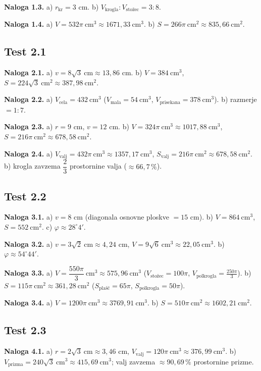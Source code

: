 \documentclass[a4paper,12pt]{article}
\theoremstyle{naloga}
\begin{document}
\textbf{Naloga 1.3.} a) $r_{\text{kr}}=3$ cm.\quad
b) $V_{\text{krogla}}:V_{\text{stožec}}=3:8$.

\textbf{Naloga 1.4.} a) $V=532\pi\ \text{cm}^3\approx1671{,}33\ \text{cm}^3$.\quad
b) $S=266\pi\ \text{cm}^2\approx835{,}66\ \text{cm}^2$.

\subsection*{Test 2.1}
\textbf{Naloga 2.1.} a) $v=8\sqrt3\ \text{cm}\approx13{,}86$ cm.\quad
b) $V=384\ \text{cm}^3$, $S=224\sqrt3\ \text{cm}^2\approx387{,}98\ \text{cm}^2$.

\textbf{Naloga 2.2.} a) $V_{\text{cela}}=432\ \text{cm}^3$ ($V_{\text{mala}}=54\ \text{cm}^3$, $V_{\text{prisekana}}=378\ \text{cm}^3$).\quad
b) razmerje $=1:7$.

\textbf{Naloga 2.3.} a) $r=9$ cm, $v=12$ cm.\quad
b) $V=324\pi\ \text{cm}^3\approx1017{,}88\ \text{cm}^3$, $S=216\pi\ \text{cm}^2\approx678{,}58\ \text{cm}^2$.

\textbf{Naloga 2.4.} a) $V_{\text{valj}}=432\pi\ \text{cm}^3\approx1357{,}17\ \text{cm}^3$, $S_{\text{valj}}=216\pi\ \text{cm}^2\approx678{,}58\ \text{cm}^2$.\quad
b) krogla zavzema $\dfrac{2}{3}$ prostornine valja ($\approx66{,}7\,\%$).

\subsection*{Test 2.2}
\textbf{Naloga 3.1.} a) $v=8$ cm (diagonala osnovne ploskve $=15$ cm).\quad
b) $V=864\ \text{cm}^3$, $S=552\ \text{cm}^2$.\quad
c) $\varphi\approx28^{\circ}4'$.

\textbf{Naloga 3.2.} a) $v=3\sqrt2\ \text{cm}\approx4{,}24$ cm, $V=9\sqrt6\ \text{cm}^3\approx22{,}05\ \text{cm}^3$.\quad
b) $\varphi\approx54^{\circ}44'$.

\textbf{Naloga 3.3.} a) $V=\dfrac{550\pi}{3}\ \text{cm}^3\approx575{,}96\ \text{cm}^3$ ($V_{\text{stožec}}=100\pi$, $V_{\text{polkrogla}}=\tfrac{250\pi}{3}$).\quad
b) $S=115\pi\ \text{cm}^2\approx361{,}28\ \text{cm}^2$ ($S_{\text{plašč}}=65\pi$, $S_{\text{polkrogla}}=50\pi$).

\textbf{Naloga 3.4.} a) $V=1200\pi\ \text{cm}^3\approx3769{,}91\ \text{cm}^3$.\quad
b) $S=510\pi\ \text{cm}^2\approx1602{,}21\ \text{cm}^2$.

\subsection*{Test 2.3}
\textbf{Naloga 4.1.} a) $r=2\sqrt3\ \text{cm}\approx3{,}46$ cm, $V_{\text{valj}}=120\pi\ \text{cm}^3\approx376{,}99\ \text{cm}^3$.\quad
b) $V_{\text{prizma}}=240\sqrt3\ \text{cm}^3\approx415{,}69\ \text{cm}^3$; valj zavzema $\approx90{,}69\,\%$ prostornine prizme.
\end{document}
